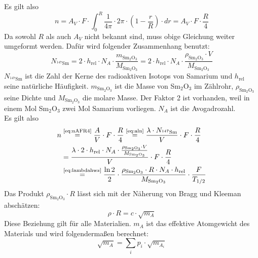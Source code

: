 Es gilt also
\begin{equation}
\label{eq:nAFR4}
  n=A_V \cdot F \cdot \int_{0}^{R}{\frac{1}{4\pi}\cdot 2\pi \cdot (1-\frac{r}{R}) \cdot dr}=
  A_V \cdot F \cdot \frac{R}{4}
\end{equation}
Da sowohl $R$ als auch $A_V$ nicht bekannt sind, muss obige Gleichung weiter umgeformt werden.
Dafür wird folgender Zusammenhang benutzt:
\begin{equation}
  N_{{}^{147}\text{Sm}}=
  2 \cdot h_{\text{rel}} \cdot N_A \cdot \frac{m_{\text{Sm}_2\text{O}_3}}{M_{\text{Sm}_2\text{O}_3}}=
  2 \cdot h_{\text{rel}} \cdot N_A \cdot \frac{\rho_{\text{Sm}_2\text{O}_3} \cdot V}{M_{\text{Sm}_2\text{O}_3}}
\end{equation}
$  N_{{}^{147}\text{Sm}}$ ist die Zahl der Kerne des radioaktiven Isotops von Samarium und
$h_{\text{rel}}$ seine natürliche Häufigkeit. $m_{\text{Sm}_2\text{O}_3}$ ist die Masse von Sm$_2$O$_3$ im Zählrohr,
$\rho_{\text{Sm}_2\text{O}_3}$ seine Dichte und $M_{\text{Sm}_2\text{O}_3}$ die molare Masse.
Der Faktor 2 ist vorhanden, weil in einem Mol Sm$_2$O$_3$ zwei Mol Samarium vorliegen.
$N_A$ ist die Avogadrozahl.\\
Es gilt also
\begin{equation}
\label{eq:samarium:halflife}
\begin{split}
  n & \refeq{eq:nAFR4}
  \frac{A}{V} \cdot F \cdot \frac{R}{4} \refeq{eq:aln} \frac{\lambda \cdot N_{{}^{147}\text{Sm}}}{V} \cdot F \cdot \frac{R}{4} \\
  &= \frac{\lambda \cdot 2 \cdot h_{\text{rel}} \cdot N_A \cdot
  \frac{\rho_{\text{Sm}_2\text{O}_3} \cdot V}{M_{\text{Sm}_2\text{O}_3}}}{V} \cdot F \cdot \frac{R}{4} \\
  & \refeq{eq:lambdahwz} \frac{\ln 2}{2} \cdot \frac{\rho_{\text{Sm}_2\text{O}_3} \cdot R \cdot N_A \cdot h_{\text{rel}}}{M_{\text{Sm}_2\text{O}_3}} 
  \cdot \frac{F}{T_{1/2}}
  \end{split}
\end{equation}
Das Produkt $\rho_{\text{Sm}_2\text{O}_3} \cdot R$ lässt sich mit der Näherung von Bragg und Kleeman abschätzen:
\begin{equation}
  \rho \cdot R = c \cdot \sqrt{m_A}
\end{equation}
Diese Beziehung gilt für alle Materialien. $m_A$ ist das effektive Atomgewicht des Materials
und wird folgendermaßen berechnet:
\begin{equation}
  \sqrt{m_A} = \sum_{i}p_i \cdot \sqrt{m_{A_i}}
\end{equation}
